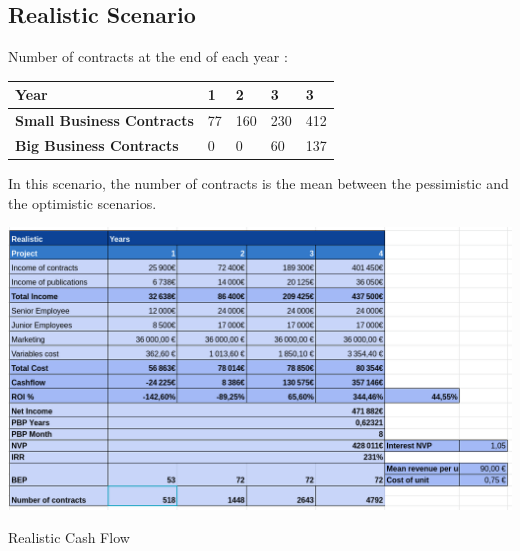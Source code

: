 \documentclass[./main.tex]{subfiles}
\begin{document}
\subsection{Realistic Scenario}
Number of contracts at the end of each year : 
\begin{table}[H]
	\centering
\begin{tabular}{|l|l|l|l|l|}
\hline
\textbf{Year}                     & 1  & 2   & 3   & 3   \\ \hline
\textbf{Small Business Contracts} & 77 & 160 & 230 & 412 \\ \hline
\textbf{Big Business Contracts}   & 0  & 0   & 60  & 137 \\ \hline
\end{tabular}
\end{table}
In this scenario, the number of contracts is the mean between the pessimistic and the optimistic scenarios.
\begin{table}[H]
	\centering
	\includegraphics[width=14cm]{img/mean.png}
	\caption{Realistic Cash Flow}
	\label{tab:realistic}
\end{table}
\end{document}
